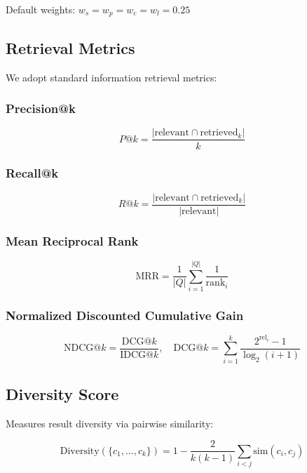 \documentclass[11pt,a4paper]{article}
\newcommand{\simfunc}{\text{sim}}
\begin{document}
Default weights: $w_s = w_p = w_c = w_l = 0.25$

\subsection{Retrieval Metrics}

We adopt standard information retrieval metrics:

\subsubsection{Precision@k}
\begin{equation}
P@k = \frac{|\text{relevant} \cap \text{retrieved}_k|}{k}
\end{equation}

\subsubsection{Recall@k}
\begin{equation}
R@k = \frac{|\text{relevant} \cap \text{retrieved}_k|}{|\text{relevant}|}
\end{equation}

\subsubsection{Mean Reciprocal Rank}
\begin{equation}
\text{MRR} = \frac{1}{|Q|} \sum_{i=1}^{|Q|} \frac{1}{\text{rank}_i}
\end{equation}

\subsubsection{Normalized Discounted Cumulative Gain}
\begin{equation}
\text{NDCG}@k = \frac{\text{DCG}@k}{\text{IDCG}@k}, \quad \text{DCG}@k = \sum_{i=1}^{k} \frac{2^{\text{rel}_i} - 1}{\log_2(i+1)}
\end{equation}

\subsection{Diversity Score}

Measures result diversity via pairwise similarity:

\begin{equation}
\text{Diversity}(\{c_1, ..., c_k\}) = 1 - \frac{2}{k(k-1)} \sum_{i<j} \simfunc(c_i, c_j)
\end{equation}
\end{document}
